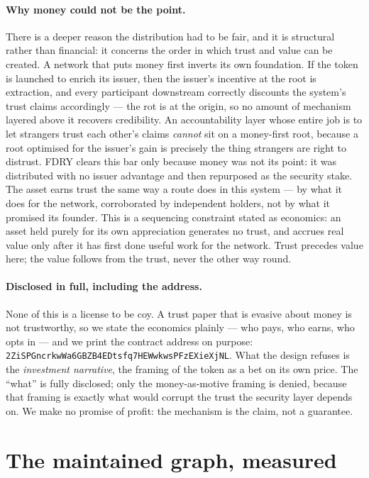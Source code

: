 \documentclass[11pt]{article}
\newcommand{\CA}{\texttt{2ZiSPGncrkwWa6GBZB4EDtsfq7HEWwkwsPFzEXieXjNL}}
\begin{document}
\paragraph{Why money could not be the point.} There is a deeper reason the
distribution had to be fair, and it is structural rather than financial: it concerns
the order in which trust and value can be created. A network that puts money first
inverts its own foundation. If the token is launched to enrich its issuer, then the
issuer's incentive at the root is extraction, and every participant downstream
correctly discounts the system's trust claims accordingly --- the rot is at the
origin, so no amount of mechanism layered above it recovers credibility. An accountability layer whose
entire job is to let strangers trust each other's claims \emph{cannot} sit on a
money-first root, because a root optimised for the issuer's gain is precisely the
thing strangers are right to distrust. FDRY clears this bar only because money was
not its point: it was distributed with no issuer advantage and then repurposed as
the security stake. The asset earns trust the same way a route does in this system
--- by what it does for the network, corroborated by independent holders, not by
what it promised its founder. This is a sequencing constraint stated as
economics: an asset held purely for its own appreciation generates no trust, and
accrues real value only after it has first done useful work for the network. Trust
precedes value here; the value follows from the trust, never the other way round.

\paragraph{Disclosed in full, including the address.} None of this is a license to
be coy. A trust paper that is evasive about money is not trustworthy, so we state
the economics plainly --- who pays, who earns, who opts in --- and we print the
contract address on purpose: \CA{}. What the design refuses is the
\emph{investment narrative}, the framing of the token as a bet on its own price.
The ``what'' is fully disclosed; only the money-as-motive framing is denied,
because that framing is exactly what would corrupt the trust the security layer
depends on. We make no promise of profit: the mechanism is the claim, not a guarantee.

\section{The maintained graph, measured}
\end{document}
